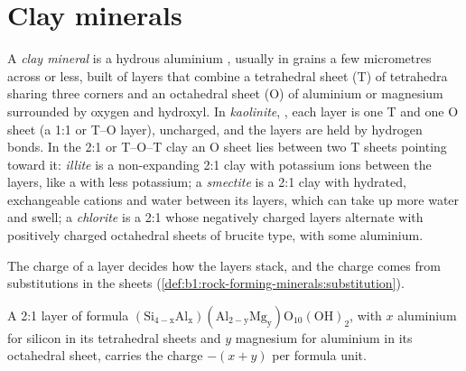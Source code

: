 \section{Clay minerals}\label{sec:b1:weathering-clays:clays}

\begin{definition}\label{def:b1:weathering-clays:clay-mineral}
A \emph{clay mineral} is a hydrous aluminium
, usually in grains a few micrometres across or less, built of
layers that combine a tetrahedral sheet (T) of  tetrahedra sharing
three corners and an octahedral sheet (O) of aluminium or magnesium surrounded
by oxygen and hydroxyl. In \emph{kaolinite},
, each layer is one T and one O sheet (a 1:1 or T--O layer),
uncharged, and the layers are held by hydrogen bonds. In the 2:1 or T--O--T
clay  an O sheet lies between two T sheets pointing toward it:
\emph{illite} is a non-expanding 2:1 clay  with potassium
ions between the layers, like a  with less potassium;
a \emph{smectite} is a 2:1 clay  with hydrated,
exchangeable cations and water between its layers, which can take up more
water and swell; a \emph{chlorite} is a 2:1  whose
negatively charged layers alternate with positively charged octahedral sheets
of brucite type,  with some aluminium.
\end{definition}

The charge of a layer decides how the layers stack, and the charge comes from
substitutions in the sheets (\cref{def:b1:rock-forming-minerals:substitution}).

\begin{proposition}\label{prop:b1:weathering-clays:layer-charge}
A 2:1 layer of formula $\mathrm{(Si_{4-x}Al_x)(Al_{2-y}Mg_y)O_{10}(OH)_2}$, with
$x$ aluminium for silicon in its tetrahedral sheets and $y$ magnesium for
aluminium in its octahedral sheet, carries the charge $-(x + y)$ per formula
unit.
\end{proposition}

